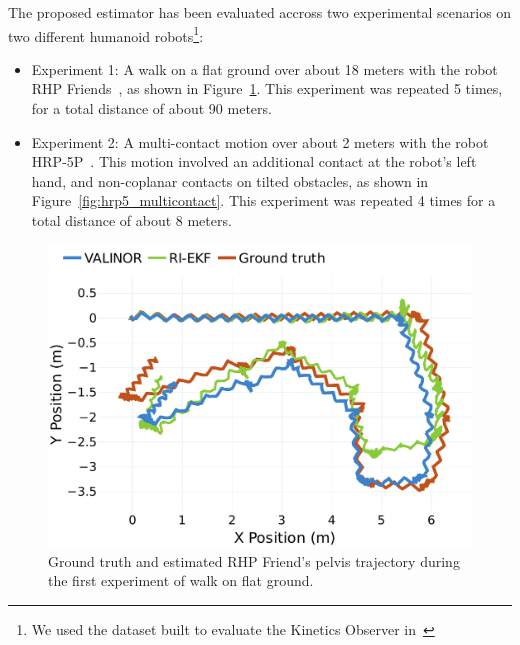\documentclass{IJCAS}
\begin{document}
The proposed estimator has been evaluated accross two experimental scenarios on two different humanoid robots\footnote{We used the dataset built to evaluate the Kinetics Observer in~\cite{Demont2024KineticsObserver}}:
\begin{itemize}
    \item Experiment 1: A walk on a flat ground over about 18 meters with the robot RHP Friends~\cite{Benallegue2025RhpFriendsJRL}, as shown in Figure~\ref{fig:trajRhps1}. This experiment was repeated 5 times, for a total distance of about 90 meters.
    \item Experiment 2: A multi-contact motion over about 2 meters with the robot HRP-5P~\cite{Kaneko2019Hrp5}. This motion involved an additional contact at the robot's left hand, and non-coplanar contacts on tilted obstacles, as shown in Figure~\ref{fig:hrp5_multicontact}. This experiment was repeated 4 times for a total distance of about 8 meters.
\end{itemize}


\begin{figure}[!h]
\begin{center}
\includegraphics[width=\columnwidth]{Uploaded/Images/trajectory_rhps1.pdf} 
\vskip -0.5pc
\caption{Ground truth and estimated RHP Friend's pelvis trajectory during the first experiment of walk on flat ground.}\label{fig:trajRhps1}
\end{center}
\vskip -1.5pc
\end{figure}
\end{document}
